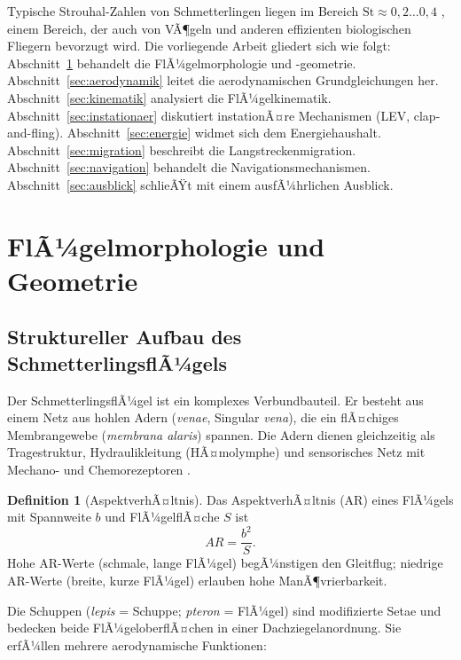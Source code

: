 ﻿\documentclass[a4paper,12pt]{article}
\theoremstyle{definition}
\newtheorem{definition}{Definition}
\begin{document}
	Typische Strouhal-Zahlen von Schmetterlingen liegen im Bereich
	$\mathrm{St} \approx 0{,}2\ldots0{,}4$ \cite{ellington1996leading},
	einem Bereich, der auch von VÃ¶geln und anderen effizienten biologischen Fliegern bevorzugt
	wird.
	Die vorliegende Arbeit gliedert sich wie folgt:
	Abschnitt~\ref{sec:morphologie} behandelt die FlÃ¼gelmorphologie und -geometrie.
	Abschnitt~\ref{sec:aerodynamik} leitet die aerodynamischen Grundgleichungen her.
	Abschnitt~\ref{sec:kinematik} analysiert die FlÃ¼gelkinematik.
	Abschnitt~\ref{sec:instationaer} diskutiert instationÃ¤re Mechanismen (LEV, clap-and-fling).
	Abschnitt~\ref{sec:energie} widmet sich dem Energiehaushalt.
	Abschnitt~\ref{sec:migration} beschreibt die Langstreckenmigration.
	Abschnitt~\ref{sec:navigation} behandelt die Navigationsmechanismen.
	Abschnitt~\ref{sec:ausblick} schlieÃŸt mit einem ausfÃ¼hrlichen Ausblick.
	
	\section{FlÃ¼gelmorphologie und Geometrie}
	\label{sec:morphologie}
	
	\subsection{Struktureller Aufbau des SchmetterlingsflÃ¼gels}
	
	Der SchmetterlingsflÃ¼gel ist ein komplexes Verbundbauteil.
	Er besteht aus einem Netz aus hohlen Adern (\textit{venae}, Singular \textit{vena}),
	die ein flÃ¤chiges Membrangewebe (\textit{membrana alaris}) spannen.
	Die Adern dienen gleichzeitig als Tragestruktur, Hydraulikleitung
	(HÃ¤molymphe) und sensorisches Netz mit Mechano- und Chemorezeptoren
	\cite{wootton1981support}.
	
	\begin{definition}[AspektverhÃ¤ltnis]
		Das AspektverhÃ¤ltnis (AR) eines FlÃ¼gels mit Spannweite $b$ und FlÃ¼gelflÃ¤che $S$ ist
		\[
		AR = \frac{b^2}{S}.
		\]
		Hohe AR-Werte (schmale, lange FlÃ¼gel) begÃ¼nstigen den Gleitflug;
		niedrige AR-Werte (breite, kurze FlÃ¼gel) erlauben hohe ManÃ¶vrierbarkeit.
	\end{definition}
	
	Die Schuppen (\textit{lepis} = Schuppe; \textit{pteron} = FlÃ¼gel) sind modifizierte
	Setae und bedecken beide FlÃ¼geloberflÃ¤chen in einer Dachziegelanordnung.
	Sie erfÃ¼llen mehrere aerodynamische Funktionen:
	
\end{document}
